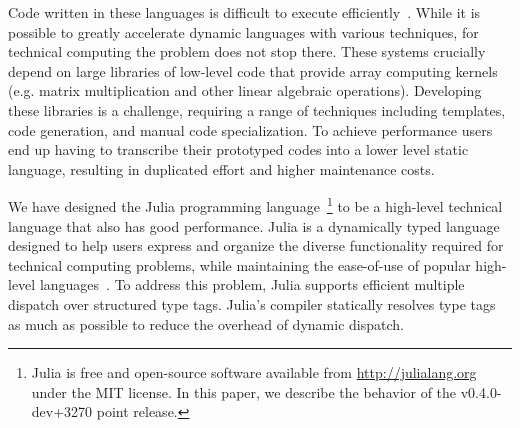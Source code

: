 Code written in these languages is difficult to execute efficiently~\cite{Joisha2001,Joisha2006,Seljebotn2009}.
While it is possible
to greatly accelerate dynamic languages with various techniques, for
technical computing the problem does not stop there. These systems
crucially depend on large libraries of low-level code that provide array
computing kernels (e.g. matrix multiplication and other linear algebraic
operations). Developing these libraries is a challenge, requiring a range of
techniques including templates, code generation, and manual code
specialization. To achieve performance users end up having to transcribe their prototyped codes into a lower level static language, resulting in duplicated effort and higher maintenance costs.

We have designed the Julia programming language~\footnote{Julia is free and open-source software available from \url{http://julialang.org} under the MIT license. In this paper, we describe the behavior of the v0.4.0-dev+3270 point release.} to be a high-level technical language that also has good performance.
Julia is a dynamically typed language designed to help users express and organize the diverse functionality required for technical computing problems, while maintaining the ease-of-use of popular high-level languages~\cite{Bezanson2012,Bezanson2014}.
To address this problem, Julia supports efficient multiple dispatch over structured type tags.
Julia's compiler statically resolves type tags as much as possible to reduce the overhead of dynamic dispatch.


